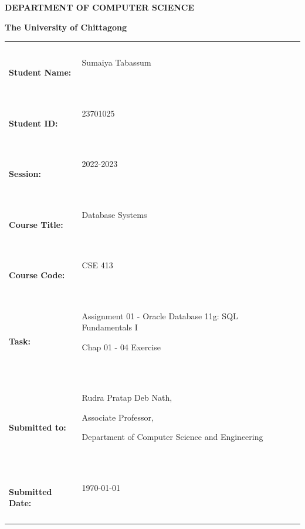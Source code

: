 


\usepackage{svg} 
\usepackage{graphicx}
\graphicspath{{./images/}}

\usepackage{makeidx}
\usepackage{listings}
\usepackage{courier} 
\lstset{
  basicstyle=\ttfamily\small,
  columns=fullflexible,
  frame=single,
  breaklines=true,
  showstringspaces=false,
  tabsize=2,
  xleftmargin=2em
}

\makeindex



\begin{center}
   
\end{center}


\begin{center}
  \Huge{{\textbf{DEPARTMENT OF
  COMPUTER SCIENCE}}}
\end{center}


\begin{center}
  \large\textbf{The University of Chittagong}
\end{center}

{\vspace{1em}}

\begin{center}
  \begin{tabular}{|lp{10.0cm}lll|}
    \hline

    &  &  &  & \\
    &  &  &  & \\
    \textbf{Student Name:} & Sumaiya Tabassum
    
    \  &  &  &  \\
    \textbf{Student ID:} & 23701025

    \  &  &  & \\
    \textbf{Session:} & 2022-2023
    
    \  &  &  & \\
    \textbf{Course Title:} & Database Systems
    
    \  &  &  & \\
    \textbf{Course Code:} & CSE 413

    \  &  &  & \\
    \textbf{Task:} & Assignment 01 - Oracle Database 11g: SQL
Fundamentals I 

Chap 01 - 04 Exercise
    
    \  &  &  & \\
    \textbf{Submitted to:} & Rudra Pratap Deb Nath,
    
    Associate Professor,
    
    Department of Computer Science and Engineering
    
    \  &  &  & \\
    \textbf{Submitted Date:} & \today
    \
    
    \  &  &  & \\
    \hline
  \end{tabular}
\end{center}


